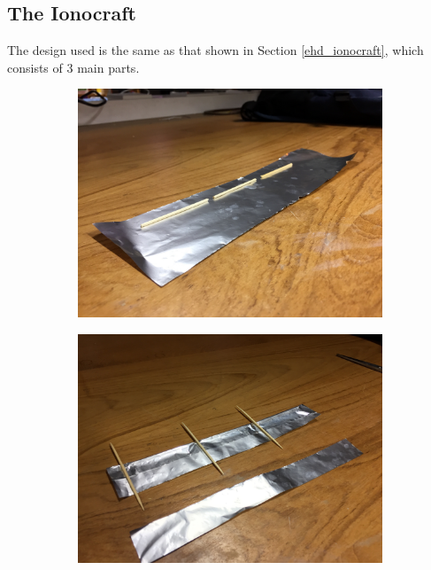 \documentclass[11pt]{article}
\begin{document}
\subsection{The Ionocraft}

The design used is the same as that shown in Section \ref{ehd_ionocraft}, which consists of 3 main parts.\\

\begin{figure}[h!]
\centering
\begin{subfigure}{0.32\textwidth}
\centering
\includegraphics[width = \textwidth]{craft_1}
\caption{}
\label{fig:craft_1}
\end{subfigure}
\begin{subfigure}{0.32\textwidth}
\centering
\includegraphics[width = \textwidth]{craft_2}

\end{subfigure}
\end{figure}
\end{document}
